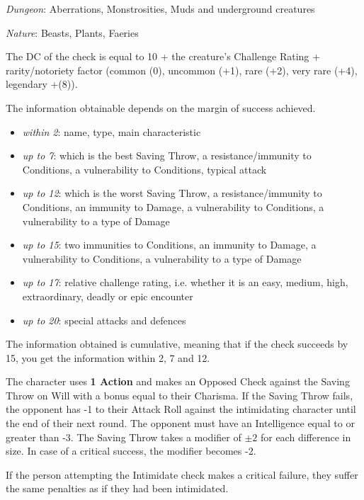 \documentclass[landscape,10pt,a4paper]{article}
\begin{document}
\begin{multicols}{3}
\begin{dmbox}[title=Recognising monsters - page \pageref{recognisingmonsters}]
\emph{Dungeon}: Aberrations, Monstrosities, Muds and underground creatures

\emph{Nature}: Beasts, Plants, Faeries

\medskip

The DC of the check is equal to 10 + the creature's Challenge Rating + rarity/notoriety factor (common (0), uncommon (+1), rare (+2), very rare (+4), legendary +(8)).

The information obtainable depends on the margin of success achieved. 

\noindent\begin{itemize}\setlength{\itemsep}{0pt}
\item \emph{within 2}: name, type, main characteristic
\item \emph{up to 7}: which is the best Saving Throw, a resistance/immunity to Conditions, a vulnerability to Conditions, typical attack
\item \emph{up to 12}: which is the worst Saving Throw, a resistance/immunity to Conditions, an immunity to Damage, a vulnerability to Conditions, a vulnerability to a type of Damage
\item \emph{up to 15}: two immunities to Conditions, an immunity to Damage, a vulnerability to Conditions, a vulnerability to a type of Damage
\item \emph{up to 17}: relative challenge rating, i.e. whether it is an easy, medium, high, extraordinary, deadly or epic encounter
\item \emph{up to 20}: special attacks and defences
\end{itemize}

\medskip

The information obtained is cumulative, meaning that if the check succeeds by 15, you get the information within 2, 7 and 12.
\end{dmbox}


\begin{dmbox}[title=Intimidate - page \pageref{intimidate}]
The character uses \textbf{1 Action} and makes an Opposed Check against the Saving Throw on Will with a bonus equal to their Charisma.
If the Saving Throw fails, the opponent has -1 to their Attack Roll against the intimidating character until the end of their next round. The opponent must have an Intelligence equal to or greater than -3. The Saving Throw takes a modifier of $\pm2$ for each difference in size. In case of a critical success, the modifier becomes -2. 

If the person attempting the Intimidate check makes a critical failure, they suffer the same penalties as if they had been intimidated.
\end{dmbox}



\end{multicols}
\end{document}
